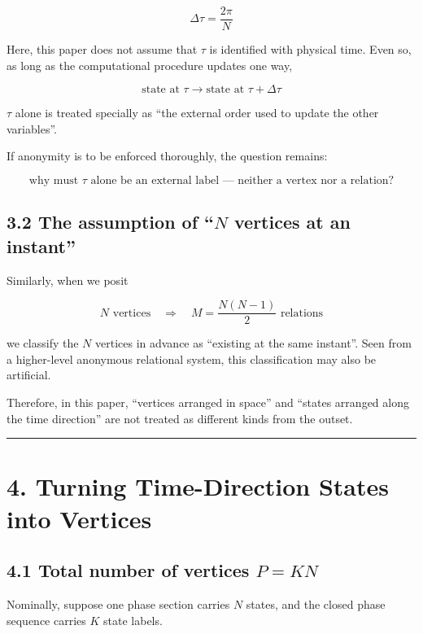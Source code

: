 \documentclass[
  a4paper,
]{article}
\begin{document}
\[
\Delta\tau
=
\frac{2\pi}{N}
\]

Here, this paper does not assume that \(\tau\) is identified with
physical time. Even so, as long as the computational procedure updates
one way,

\[
\text{state at }\tau
\longrightarrow
\text{state at }\tau+\Delta\tau
\]

\(\tau\) alone is treated specially as ``the external order used to
update the other variables''.

If anonymity is to be enforced thoroughly, the question remains:

\[
\boxed{
\text{why must }\tau\text{ alone be an external label — neither a vertex nor a relation?}
}
\]

\subsection{\texorpdfstring{3.2 The assumption of ``\(N\) vertices at an
instant''}{3.2 The assumption of ``N vertices at an instant''}}\label{the-assumption-of-n-vertices-at-an-instant}

Similarly, when we posit

\[
N\text{ vertices}
\quad\Longrightarrow\quad
M=\frac{N(N-1)}{2}\text{ relations}
\]

we classify the \(N\) vertices in advance as ``existing at the same
instant''. Seen from a higher-level anonymous relational system, this
classification may also be artificial.

Therefore, in this paper, ``vertices arranged in space'' and ``states
arranged along the time direction'' are not treated as different kinds
from the outset.

\begin{center}\rule{0.5\linewidth}{0.5pt}\end{center}

\section{4. Turning Time-Direction States into
Vertices}\label{turning-time-direction-states-into-vertices}

\subsection{\texorpdfstring{4.1 Total number of vertices
\(P=KN\)}{4.1 Total number of vertices P=KN}}\label{total-number-of-vertices-pkn}

Nominally, suppose one phase section carries \(N\) states, and the
closed phase sequence carries \(K\) state labels.
\end{document}
